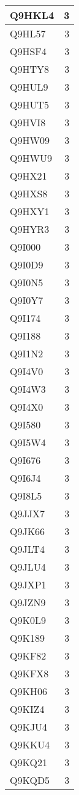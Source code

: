 \documentclass[
]{book}
\theoremstyle{definition}
\theoremstyle{definition}
\theoremstyle{definition}
\theoremstyle{definition}
\theoremstyle{remark}
\begin{document}
\begin{table}
\begin{tabular}{l|r}
\hline
Q9HKL4 & 3\\
\hline
Q9HL57 & 3\\
\hline
Q9HSF4 & 3\\
\hline
Q9HTY8 & 3\\
\hline
Q9HUL9 & 3\\
\hline
Q9HUT5 & 3\\
\hline
Q9HVI8 & 3\\
\hline
Q9HW09 & 3\\
\hline
Q9HWU9 & 3\\
\hline
Q9HX21 & 3\\
\hline
Q9HXS8 & 3\\
\hline
Q9HXY1 & 3\\
\hline
Q9HYR3 & 3\\
\hline
Q9I000 & 3\\
\hline
Q9I0D9 & 3\\
\hline
Q9I0N5 & 3\\
\hline
Q9I0Y7 & 3\\
\hline
Q9I174 & 3\\
\hline
Q9I188 & 3\\
\hline
Q9I1N2 & 3\\
\hline
Q9I4V0 & 3\\
\hline
Q9I4W3 & 3\\
\hline
Q9I4X0 & 3\\
\hline
Q9I580 & 3\\
\hline
Q9I5W4 & 3\\
\hline
Q9I676 & 3\\
\hline
Q9I6J4 & 3\\
\hline
Q9I8L5 & 3\\
\hline
Q9JJX7 & 3\\
\hline
Q9JK66 & 3\\
\hline
Q9JLT4 & 3\\
\hline
Q9JLU4 & 3\\
\hline
Q9JXP1 & 3\\
\hline
Q9JZN9 & 3\\
\hline
Q9K0L9 & 3\\
\hline
Q9K189 & 3\\
\hline
Q9KF82 & 3\\
\hline
Q9KFX8 & 3\\
\hline
Q9KH06 & 3\\
\hline
Q9KIZ4 & 3\\
\hline
Q9KJU4 & 3\\
\hline
Q9KKU4 & 3\\
\hline
Q9KQ21 & 3\\
\hline
Q9KQD5 & 3\\

\end{tabular}
\end{table}
\end{document}
